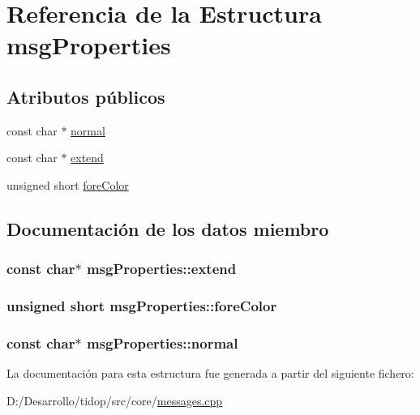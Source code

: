 \hypertarget{structmsg_properties}{}\section{Referencia de la Estructura msg\+Properties}
\label{structmsg_properties}
\subsection*{Atributos públicos}
\begin{DoxyCompactItemize}
\item 
const char $\ast$ \hyperlink{structmsg_properties_a49cb74021371b7e2d47b04a8010e76a8}{normal}
\item 
const char $\ast$ \hyperlink{structmsg_properties_a9eb055af2fdf96afc626c6e8eb62442c}{extend}
\item 
unsigned short \hyperlink{structmsg_properties_a1ae1f972fd65ebe736a209a0f3c807fe}{fore\+Color}
\end{DoxyCompactItemize}


\subsection{Documentación de los datos miembro}
\subsubsection[{\texorpdfstring{extend}{extend}}]{\setlength{\rightskip}{0pt plus 5cm}const char$\ast$ msg\+Properties\+::extend}\hypertarget{structmsg_properties_a9eb055af2fdf96afc626c6e8eb62442c}{}\label{structmsg_properties_a9eb055af2fdf96afc626c6e8eb62442c}
\subsubsection[{\texorpdfstring{fore\+Color}{foreColor}}]{\setlength{\rightskip}{0pt plus 5cm}unsigned short msg\+Properties\+::fore\+Color}\hypertarget{structmsg_properties_a1ae1f972fd65ebe736a209a0f3c807fe}{}\label{structmsg_properties_a1ae1f972fd65ebe736a209a0f3c807fe}
\subsubsection[{\texorpdfstring{normal}{normal}}]{\setlength{\rightskip}{0pt plus 5cm}const char$\ast$ msg\+Properties\+::normal}\hypertarget{structmsg_properties_a49cb74021371b7e2d47b04a8010e76a8}{}\label{structmsg_properties_a49cb74021371b7e2d47b04a8010e76a8}


La documentación para esta estructura fue generada a partir del siguiente fichero\+:\begin{DoxyCompactItemize}
\item 
D\+:/\+Desarrollo/tidop/src/core/\hyperlink{messages_8cpp}{messages.\+cpp}\end{DoxyCompactItemize}
